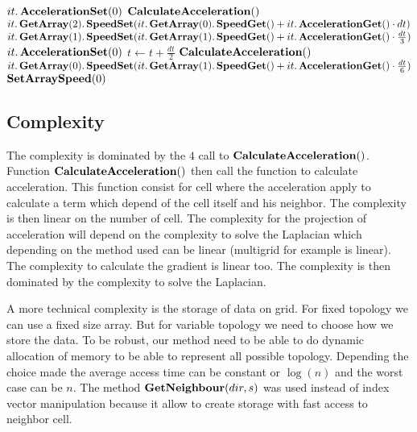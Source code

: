 \begin{algorithm}
\begin{algorithmic}[1]
            \State $it.\mathop{\textbf{AccelerationSet}}(0)$
        \EndFor
        \State $\mathop{\textbf{CalculateAcceleration}}()$
            \State $it.\mathop{\textbf{GetArray}}(2).\mathop{\textbf{SpeedSet}}(it.\mathop{\textbf{GetArray}}(0).\mathop{\textbf{SpeedGet}}()+it.\mathop{\textbf{AccelerationGet}}()\cdot dt)$
            \State $it.\mathop{\textbf{GetArray}}(1).\mathop{\textbf{SpeedSet}}(it.\mathop{\textbf{GetArray}}(1).\mathop{\textbf{SpeedGet}}()+it.\mathop{\textbf{AccelerationGet}}()\cdot \frac{dt}{3})$
        \EndFor
            \State $it.\mathop{\textbf{AccelerationSet}}(0)$
        \EndFor
        \State $t\gets t+\frac{dt}{2}$
        \State $\mathop{\textbf{CalculateAcceleration}}()$
            \State $it.\mathop{\textbf{GetArray}}(0).\mathop{\textbf{SpeedSet}}(it.\mathop{\textbf{GetArray}}(1).\mathop{\textbf{SpeedGet}}()+it.\mathop{\textbf{AccelerationGet}}()\cdot \frac{dt}{6})$
         \EndFor
        \State $\mathop{\textbf{SetArraySpeed}}(0)$
        \EndProcedure
        \end{algorithmic}
\end{algorithm}

\subsection{Complexity}

The complexity is dominated by the $4$ call to $\mathop{\textbf{CalculateAcceleration}}()$.
Function $\mathop{\textbf{CalculateAcceleration}}()$ then call the function to calculate acceleration.
This function consist for cell where the acceleration apply to calculate a term which depend of the cell itself and his neighbor.
The complexity is then linear on the number of cell.
The complexity for the projection of acceleration will depend on the complexity to solve the Laplacian which depending
on the method used can be linear (multigrid for example is linear). The complexity to calculate the gradient is linear too.
The complexity is then dominated by the complexity to solve the Laplacian.

A more technical complexity is the storage of data on grid. For fixed topology we can use a fixed size array.
But for variable topology we need to choose how we store the data.
To be robust, our method need to be able to do dynamic allocation of memory to be able to represent all possible topology.
Depending the choice made the average access time can be constant or $\log(n)$ and the worst case can be $n$.
The method $\mathop{\textbf{GetNeighbour}}(dir,s)$ was used instead of index vector manipulation because it allow to create storage
with fast access to neighbor cell.


